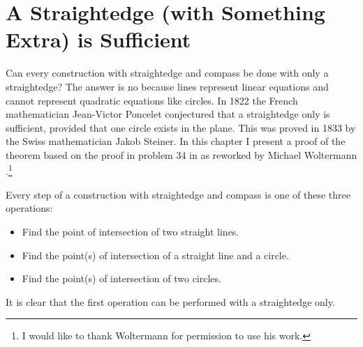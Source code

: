 
\chapter{A Straightedge (with Something Extra) is Sufficient}\label{c.straightedge}

Can every construction with straightedge and compass be done with only a straightedge? The answer is no because lines represent linear equations and cannot represent quadratic equations like circles. In 1822 the French mathematician Jean-Victor Poncelet conjectured that a straightedge only is sufficient, provided that one circle exists in the plane. This was proved in 1833 by the Swiss mathematician Jakob Steiner. In this chapter I present a proof of the theorem based on the proof in problem 34 in \cite{dorrie1} as reworked by Michael Woltermann \cite{dorrie2}.\footnote{I would like to thank Woltermann for permission to use his work.}

Every step of a construction with straightedge and compass is one of these three operations:
\begin{itemize}
\setlength{\itemsep}{0pt}
\item Find the point of intersection of two straight lines.
\item Find the point(s) of intersection of a straight line and a circle.
\item Find the point(s) of intersection of two circles.
\end{itemize}
It is clear that the first operation can be performed with a straightedge only.

